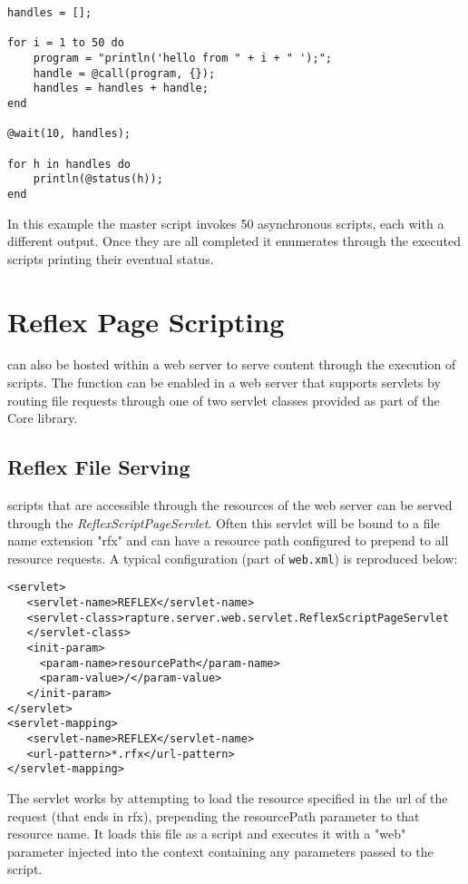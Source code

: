 \begin{lstlisting}[caption={Call and Wait example}]
handles = [];

for i = 1 to 50 do
    program = "println('hello from " + i + " ');";
    handle = @call(program, {});
    handles = handles + handle;
end

@wait(10, handles);

for h in handles do
    println(@status(h));
end
\end{lstlisting}
In this example the master script invokes 50 asynchronous scripts, each with a different output. Once they are all completed it enumerates through the executed scripts printing their eventual status.

\chapter{Reflex Page Scripting}
\Reflex can also be hosted within a web server to serve content through the execution of \Reflex scripts. The function can be enabled in a web server that supports servlets by routing file requests through one of two servlet classes provided as part of the \Rapture Core library.

\section{Reflex File Serving}
\Reflex scripts that are accessible through the resources of the web server can be served through the \emph{ReflexScriptPageServlet}. Often this servlet will be bound to a file name extension "rfx" and can have a resource path configured to prepend to all resource requests. A typical configuration (part of \Verb+web.xml+) is reproduced below:

\begin{Verbatim}
<servlet>
   <servlet-name>REFLEX</servlet-name>
   <servlet-class>rapture.server.web.servlet.ReflexScriptPageServlet
   </servlet-class>
   <init-param>
     <param-name>resourcePath</param-name>
     <param-value>/</param-value>
   </init-param>
</servlet>
<servlet-mapping>
   <servlet-name>REFLEX</servlet-name>
   <url-pattern>*.rfx</url-pattern>
</servlet-mapping>
\end{Verbatim}

The servlet works by attempting to load the resource specified in the url of the request (that ends in rfx), prepending the resourcePath parameter to that resource name. It loads this file as a \Reflex script and executes it with a "web" parameter injected into the context containing any parameters passed to the script.

